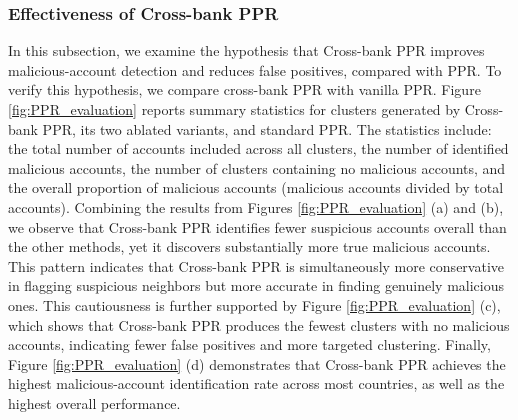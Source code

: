 \documentclass[11pt,english]{article}
\begin{document}
\subsubsection{Effectiveness of Cross-bank PPR}
In this subsection, we examine the hypothesis that Cross-bank PPR improves malicious-account detection and reduces false positives, compared with PPR. To verify this hypothesis, we compare cross-bank PPR with vanilla PPR. Figure \ref{fig:PPR_evaluation} reports summary statistics for clusters generated by Cross-bank PPR, its two ablated variants, and standard PPR. The statistics include: the total number of accounts included across all clusters, the number of identified malicious accounts, the number of clusters containing no malicious accounts, and the overall proportion of malicious accounts (malicious accounts divided by total accounts).
Combining the results from Figures \ref{fig:PPR_evaluation} (a) and (b), we observe that Cross-bank PPR identifies fewer suspicious accounts overall than the other methods, yet it discovers substantially more true malicious accounts. This pattern indicates that Cross-bank PPR is simultaneously more conservative in flagging suspicious neighbors but more accurate in finding genuinely malicious ones. This cautiousness is further supported by Figure \ref{fig:PPR_evaluation} (c), which shows that Cross-bank PPR produces the fewest clusters with no malicious accounts, indicating fewer false positives and more targeted clustering. Finally, Figure \ref{fig:PPR_evaluation} (d) demonstrates that Cross-bank PPR achieves the highest malicious-account identification rate across most countries, as well as the highest overall performance.
\end{document}
